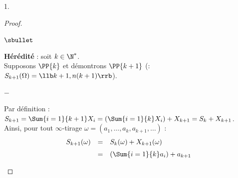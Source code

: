 \begin{noliste}{1.}
\begin{proof}
\begin{remark}
\begin{noliste}{$\sbullet$}
\begin{noliste}{\fitem}
        \item {\bf Hérédité} : soit $k \in \N^*$.\\
          Supposons $\PP{k}$ et démontrons $\PP{k+1}$ (\ie :
          $S_{k+1}(\Omega) = \llb k+1, n(k+1) \rrb$).%
          \begin{noliste}{$-$}
          \item Par définition : $S_{k+1} = \Sum{i=1}{k+1} X_i =
            \left(\Sum{i=1}{k} X_i \right) + X_{k+1} = S_k + X_{k+1}$.\\[.2cm]
            Ainsi, pour tout $\infty$-tirage $\omega = (a_1, \hdots,
            a_k, a_{k+1}, \hdots)$ :
            \[
            \begin{array}{rcl}
              S_{k+1}(\omega) & = & S_k(\omega) + X_{k+1}(\omega)
              \\[.2cm]
              & = & \left( \Sum{i=1}{k} a_i \right) + a_{k+1}
            \end{array}
            \]


\end{noliste}
\end{noliste}
\end{noliste}
\end{remark}
\end{proof}
\end{noliste}
